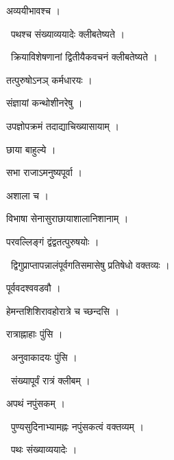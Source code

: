 \documentclass[10pt, openany, oneside]{book}
\begin{document}
\noindent अव्ययीभावश्च ।

\par\noindent\hspace{1.5em}{\vps वा॰}~{\qt पथश्च संख्याव्ययादेः क्लीबतेष्यते ।}

\par\noindent\hspace{1.5em}{\vps वा॰}~{\qt क्रियाविशेषणानां द्वितीयैकवचनं क्लीबतेष्यते ।}

\noindent तत्पुरुषोऽनञ् कर्मधारयः ।

\noindent संज्ञायां कन्थोशीनरेषु ।

\noindent उपज्ञोपक्रमं तदाद्याचिख्यासायाम् ।

\noindent छाया बाहुल्ये ।

\noindent सभा राजाऽमनुष्यपूर्वा ।

\noindent अशाला च ।

\noindent विभाषा सेनासुराछायाशालानिशानाम् ।

\noindent परवल्लिङ्गं द्वंद्वतत्पुरुषयोः ।

\par\noindent\hspace{1.5em}{\vps वा॰}~{\qt द्विगुप्राप्तापन्नालंपूर्वगतिसमासेषु प्रतिषेधो वक्तव्यः ।}

\noindent पूर्ववदश्ववडवौ ।

\noindent हेमन्तशिशिरावहोरात्रे च च्छन्दसि ।

\noindent रात्राह्नाहाः पुंसि ।

\par\noindent\hspace{1.5em}{\vps वा॰}~{\qt अनुवाकादयः पुंसि ।}

\par\noindent\hspace{1.5em}{\vps वा॰}~{\qt संख्यापूर्वं रात्रं क्लीबम् ।}

\noindent अपथं नपुंसकम् ।

\par\noindent\hspace{1.5em}{\vps वा॰}~{\qt पुण्यसुदिनाभ्यामह्नः नपुंसकत्वं वक्तव्यम् ।}

\par\noindent\hspace{1.5em}{\vps वा॰}~{\qt पथः संख्याव्ययादेः ।}
\end{document}
